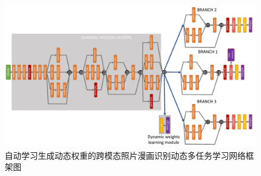 \documentclass[12pt]{article}
\begin{document}
\begin{sloppypar}
\begin{figure}[H]
	\centering
	\includegraphics[width=\textwidth]{sections/figs/cnn.png}
	\caption{\label{fig2.11} \xiaowuhao \hei 自动学习生成动态权重的跨模态照片漫画识别动态多任务学习网络框架图}
\end{figure}
\begin{multicols*}{2}
~\\~\\~\\~\\~\\~\\~\\~\\


    
    
   \vspace{0.5cm}
   	\nocite{*}
    \end{multicols*}
 
\end{sloppypar}
\end{document}
